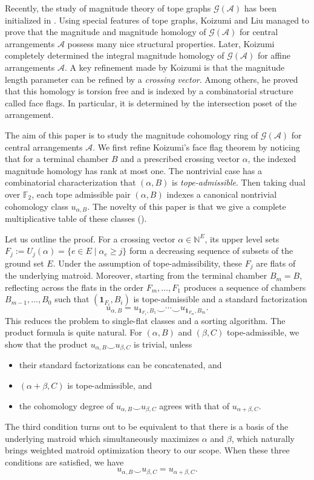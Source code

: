 \documentclass[10pt]{amsart}
\theoremstyle{plain}
\theoremstyle{definition}
\newcommand{\one}{\mathbf{1}}
\newcommand{\NN}{\mathbb{N}}
\newcommand{\A}{\mathcal{A}}
\newcommand{\G}{\mathcal{G}}
\newcommand{\Ftwo}{\mathbb F_2}
\begin{document}
Recently, the study of magnitude theory of tope graphs $\G(\A)$ has been initialized in \cite{Koizumi2026}. Using special features of tope graphs, Koizumi and Liu managed to prove that the magnitude and magnitude homology of $\G(\A)$ for central arrangements $\A$ possess many nice structural properties. Later, Koizumi \cite{Koizumi2026a} completely determined the integral magnitude homology of $\G(\A)$ for affine arrangements $\A$. A key refinement made by Koizumi is that the magnitude length parameter can be refined by a \emph{crossing vector}. Among others, he proved that this homology is torsion free and is indexed by a combinatorial structure called face flags. In particular, it is determined by the intersection poset of the arrangement.

The aim of this paper is to study the magnitude cohomology ring of $\G(\A)$ for central arrangements $\A$. We first refine Koizumi's face flag theorem by noticing that for a terminal chamber $B$ and a prescribed crossing vector $\alpha$, the indexed magnitude homology has rank at most one. The nontrivial case has a combinatorial characterization that $(\alpha,B)$ is \emph{tope-admissible}. Then taking dual over $\Ftwo$, each tope admissible pair $(\alpha,B)$ indexes a canonical nontrivial cohomology class $u_{\alpha,B}$. The novelty of this paper is that we give a complete multiplicative table of these classes (). 

Let us outline the proof. For a crossing vector $\alpha\in\NN^E$, its upper level sets $F_j:=U_j(\alpha)=\{e\in E\mid \alpha_e\geq j\}$ form a decreasing sequence of subsets of the ground set $E$. Under the assumption of tope-admissibility, these $F_j$ are flats of the underlying matroid. Moreover, starting from the terminal chamber $B_m=B$, reflecting across the flats in the order $F_m,\ldots,F_1$ produces a sequence of chambers $B_{m-1},\ldots,B_0$ such that $(\one_{F_i},B_i)$ is tope-admissible and a standard factorization
\[
u_{\alpha,B}=u_{\one_{F_1},B_1}\smile\cdots\smile u_{\one_{F_m},B_m}.
\]
This reduces the problem to single-flat classes and a sorting algorithm. The product formula is quite natural. For $(\alpha,B)$ and $(\beta,C)$ tope-admissible, we show that the product $u_{\alpha,B}\smile u_{\beta,C}$ is trivial, unless
\begin{itemize}
    \item their standard factorizations can be concatenated, and
    \item $(\alpha+\beta,C)$ is tope-admissible, and
    \item the cohomology degree of $u_{\alpha,B}\smile u_{\beta,C}$ agrees with that of $u_{\alpha+\beta,C}$.
\end{itemize}
The third condition turns out to be equivalent to that there is a basis of the underlying matroid which simultaneously maximizes $\alpha$ and $\beta$, which naturally brings weighted matroid optimization theory to our scope. When these three conditions are satisfied, we have
\[
u_{\alpha,B}\smile u_{\beta,C}=u_{\alpha+\beta,C}.
\]
\end{document}
